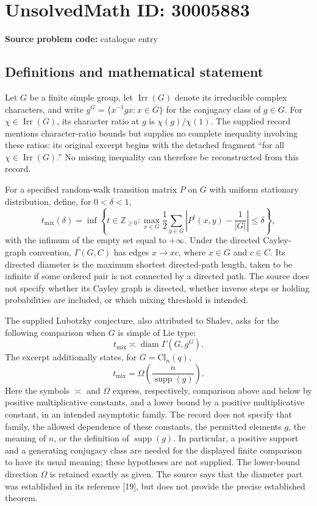 \documentclass[11pt]{article}
\newcommand{\Z}{\mathbb{Z}}
\begin{document}
\section*{UnsolvedMath ID: 30005883}
\textbf{Source problem code:} catalogue entry
\subsection{Definitions and mathematical statement}
Let \(G\) be a finite simple group, let \(\operatorname{Irr}(G)\) denote its irreducible complex characters, and write \(g^G=\{x^{-1}gx:x\in G\}\) for the conjugacy class of \(g\in G\). For \(\chi\in\operatorname{Irr}(G)\), its character ratio at \(g\) is \(\chi(g)/\chi(1)\). The supplied record mentions character-ratio bounds but supplies no complete inequality involving these ratios: its original excerpt begins with the detached fragment ``for all \(\chi\in\operatorname{Irr}(G)\).'' No missing inequality can therefore be reconstructed from this record.

For a specified random-walk transition matrix \(P\) on \(G\) with uniform stationary distribution, define, for \(0<\delta<1\),
\[
 t_{\mathrm{mix}}(\delta)=\inf\left\{t\in\Z_{\geq0}:\max_{x\in G}\frac12\sum_{y\in G}\left|P^t(x,y)-\frac1{|G|}\right|\leq\delta\right\},
\]
with the infimum of the empty set equal to \(+\infty\). Under the directed Cayley-graph convention, \(\Gamma(G,C)\) has edges \(x\to xc\), where \(x\in G\) and \(c\in C\). Its directed diameter is the maximum shortest directed-path length, taken to be infinite if some ordered pair is not connected by a directed path. The source does not specify whether its Cayley graph is directed, whether inverse steps or holding probabilities are included, or which mixing threshold is intended.

The supplied Lubotzky conjecture, also attributed to Shalev, asks for the following comparison when \(G\) is simple of Lie type:
\[
 t_{\mathrm{mix}}\asymp\operatorname{diam}\Gamma(G,g^G).
\]
The excerpt additionally states, for \(G=\mathrm{Cl}_n(q)\),
\[
 t_{\mathrm{mix}}=\Omega\!\left(\frac{n}{\operatorname{supp}(g)}\right).
\]
Here the symbols \(\asymp\) and \(\Omega\) express, respectively, comparison above and below by positive multiplicative constants, and a lower bound by a positive multiplicative constant, in an intended asymptotic family. The record does not specify that family, the allowed dependence of these constants, the permitted elements \(g\), the meaning of \(n\), or the definition of \(\operatorname{supp}(g)\). In particular, a positive support and a generating conjugacy class are needed for the displayed finite comparison to have its usual meaning; these hypotheses are not supplied. The lower-bound direction \(\Omega\) is retained exactly as given. The source says that the diameter part was established in its reference [19], but does not provide the precise established theorem.
\end{document}
